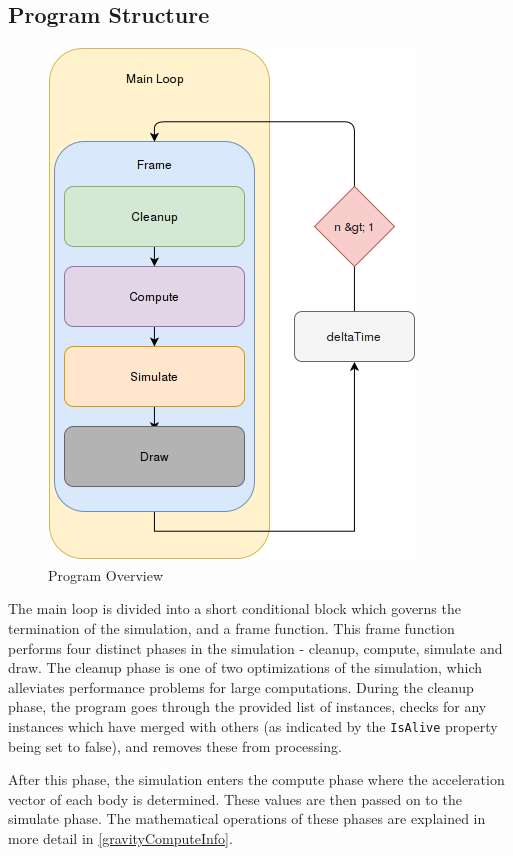 \documentclass[11pt]{article}
\begin{document}
\subsection{Program Structure}
\begin{figure}
	\vspace{-12pt}
	\begin{center}
    	\includegraphics[scale=0.40]{MainLoopDiagram}
    \end{center}
    \caption{Program Overview}
\end{figure}

The main loop is divided into a short conditional block which governs the termination of the simulation, and a frame function.
This frame function performs four distinct phases in the simulation - cleanup, compute, simulate and draw. The cleanup phase is one of two optimizations of the simulation, which alleviates performance problems for large computations. During the cleanup phase, the program goes through the provided list of instances, checks for any instances which have merged with others (as indicated by the \verb|IsAlive| property being set to false), and removes these from processing.

After this phase, the simulation enters the compute phase where the acceleration vector of each body is determined. These values are then passed on to the simulate phase. The mathematical operations of these phases are  explained in more detail in \ref{gravityComputeInfo}. 
\end{document}
